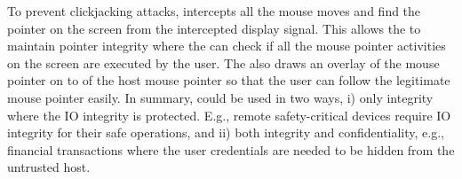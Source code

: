 To prevent clickjacking attacks, \device intercepts all the mouse moves and find the pointer on the screen from the intercepted display signal. This allows the \device to maintain pointer integrity where the \device can check if all the mouse pointer activities on the screen are executed by the user. The \device also draws an overlay of the mouse pointer on to of the host mouse pointer so that the user can follow the legitimate mouse pointer easily. In summary, \name could be used in two ways, i) only integrity where the IO integrity is protected. E.g., remote safety-critical devices require IO integrity for their safe operations, and ii) both integrity and confidentiality, e.g., financial transactions where the user credentials are needed to be hidden from the untrusted host.  



